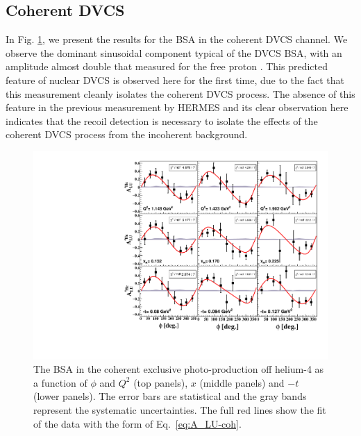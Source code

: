 \documentclass[aps,prc,preprint,superscriptaddress]{revtex4}
\begin{document}
\subsection{Coherent DVCS}

In Fig. \ref{fig:CohALUphi}, we present the results for the BSA in the coherent DVCS channel. We 
observe the dominant sinusoidal component typical of the DVCS BSA, with an amplitude almost 
double that measured for the free proton \cite{Jo:2015ema}. This 
predicted feature of nuclear DVCS \cite{Guzey:2003jh} is observed here for the first time, due
to the fact that this measurement cleanly isolates the coherent DVCS process. The absence of 
this feature in the previous measurement by HERMES \cite{Airapetian:2009cga} and its clear 
observation here indicates that the recoil detection is necessary to isolate the effects of 
the coherent DVCS process from the incoherent background. 

\begin{figure}[bp!]
\center
\includegraphics[width=12cm]{Coherent_ALU_phi.pdf}
	\caption{The BSA in the coherent exclusive photo-production off helium-4 as a 
	function of $\phi$ and $Q^2$ 
	(top panels), $x$ (middle panels) and $-t$ (lower panels). The error bars are  
	statistical and the gray bands represent the systematic uncertainties. The full red lines show
	the fit of the data with the form of Eq.~\ref{eq:A_LU-coh}.}
\label{fig:CohALUphi}
\end{figure}
\end{document}
